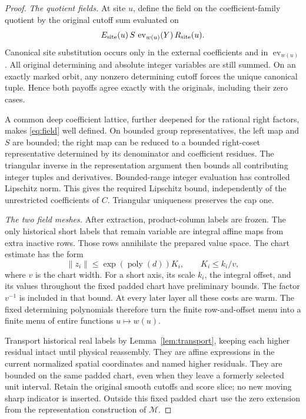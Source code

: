 \documentclass[11pt,a4paper]{article}
\theoremstyle{definition}
\newcommand{\M}{\mathcal M}
\newcommand{\ev}{\operatorname{ev}}
\newcommand{\poly}{\operatorname{poly}}
\begin{document}
\begin{proof}
\textit{The quotient fields.}
At site \(u\), define the field on the coefficient-family quotient by
the original cutoff sum evaluated on
\begin{equation}\label{eq:field}
 E_{\rm site}(u)\,S\,
       \ev_{w(u)}(Y)\,R_{\rm site}(u).
\end{equation}
Canonical site substitution occurs only in the external coefficients
and in \(\ev_{w(u)}\). All original determining and absolute integer
variables are still summed. On an exactly marked orbit, any nonzero
determining cutoff forces the unique canonical tuple. Hence both
payoffs agree exactly with the originals, including their zero
cases.

A common deep coefficient lattice, further deepened for the rational
right factors, makes \eqref{eq:field} well defined. On bounded group
representatives, the left map and \(S\) are bounded; the right map
can be reduced to a bounded right-coset representative determined by
its denominator and coefficient residues. The triangular inverse
in the representation argument then bounds all contributing integer
tuples and derivatives. Bounded-range integer evaluation has
controlled Lipschitz norm. This gives the required Lipschitz bound,
independently of the unrestricted coefficients of \(C\).
Triangular uniqueness preserves the cap one.

\textit{The two field meshes.}
After extraction, product-column labels are frozen. The only
historical short labels that remain variable are integral affine
maps from extra inactive rows. Those rows annihilate the prepared
value space. The chart estimate has the form
\[
 \|z_i\|\le \exp(\poly(d))K_i,\qquad K_i\le k_i/v,
\]
where \(v\) is the chart width. For a short axis, its scale \(k_i\),
the integral offset, and its values throughout the fixed padded
chart have preliminary bounds. The factor \(v^{-1}\) is included
in that bound. At every later layer all these costs are warm.
The fixed determining polynomials therefore turn the finite
row-and-offset menu into a finite menu of entire functions
\(u\mapsto w(u)\).

Transport historical real labels by Lemma~\ref{lem:transport}, keeping
each higher residual intact until physical reassembly. They are affine
expressions in the current normalized spatial coordinates and named
higher residuals. They are bounded on the same padded chart, even when
they leave a formerly selected unit interval. Retain the original
smooth cutoffs and score slice; no new moving sharp indicator is
inserted. Outside this fixed padded chart use the zero extension
from the representation construction of \(\M\).


\end{proof}
\end{document}
